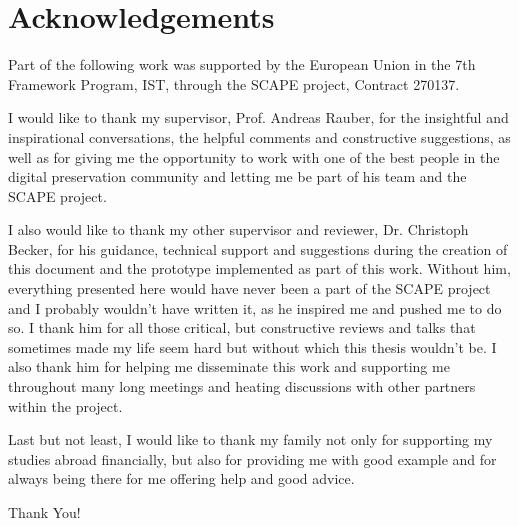\chapter*{Acknowledgements}
Part of the following  work was supported by the European Union in the 7th Framework Program, IST, through the SCAPE project, Contract 270137. \newline\newline

I would like to thank my supervisor, Prof. Andreas Rauber, for the insightful and inspirational conversations, the helpful comments and constructive suggestions, as well as for giving me the opportunity to work with one of the best people in the digital preservation community and letting me be part of his team and the SCAPE project.

I also would like to thank my other supervisor and reviewer, Dr. Christoph Becker, for his guidance, technical support and suggestions during the creation of this document and the prototype implemented as part of this work. Without him, everything presented here would have never been a part of the SCAPE project and I probably wouldn't have written it, as he inspired me and pushed me to do so. I thank him for all those critical, but constructive reviews and talks that sometimes made my life seem hard but without which this thesis wouldn't be. I also thank him for helping me disseminate this work and supporting me throughout many long meetings and heating discussions with other partners within the project.

Last but not least, I would like to thank my family not only for supporting my studies abroad financially, but also for providing me with good example and for always being there for me offering help and good advice.\newline\newline

Thank You!